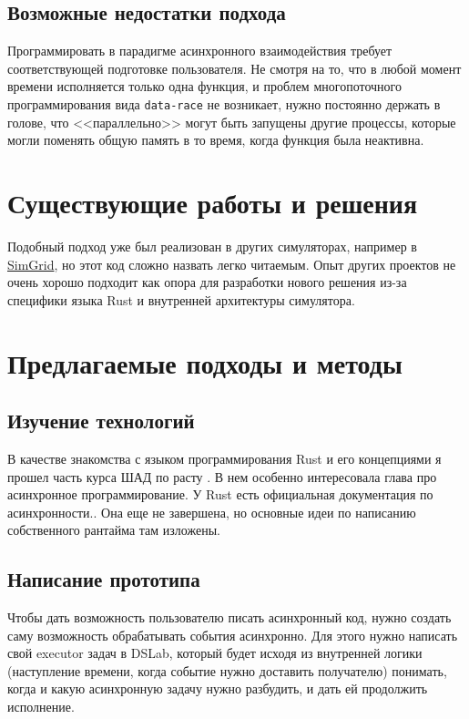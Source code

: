 \subsection{Возможные недостатки подхода}

Программировать в парадигме асинхронного взаимодействия требует соответствующей подготовке пользователя. Не смотря на то, что в любой момент времени исполняется только одна функция, и проблем многопоточного программирования вида \texttt{data-race} не возникает, нужно постоянно держать в голове, что <<параллельно>> могут быть запущены другие процессы, которые могли поменять общую память в то время, когда функция была неактивна. 

\section{Существующие работы и решения}

Подобный подход уже был реализован в других симуляторах, например в \href{https://github.com/osukhoroslov/dslab/blob/main/examples-other/simgrid/ping-pong/process.cpp}
{SimGrid}, но этот код сложно назвать легко читаемым. Опыт других проектов не очень хорошо подходит как опора для разработки нового решения из-за специфики языка Rust и внутренней архитектуры симулятора.

\section{Предлагаемые подходы и методы} 

\subsection{Изучение технологий}
В качестве знакомства с языком программирования Rust и его концепциями я прошел часть курса ШАД по расту \cite{shad-rust}. В нем особенно интересовала глава про асинхронное программирование. У Rust есть официальная документация по асинхронности.\cite{async-book}. Она еще не завершена, но основные идеи по написанию собственного рантайма там изложены.


\subsection{Написание прототипа}
Чтобы дать возможность пользователю писать асинхронный код, нужно создать саму возможность обрабатывать события асинхронно. Для этого нужно написать свой executor задач в DSLab, который будет исходя из внутренней логики (наступление времени, когда событие нужно доставить получателю) понимать, когда и какую асинхронную задачу нужно разбудить, и дать ей продолжить исполнение. 

